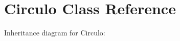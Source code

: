 \hypertarget{classCirculo}{}\section{Circulo Class Reference}
\label{classCirculo}


Inheritance diagram for Circulo\+:
